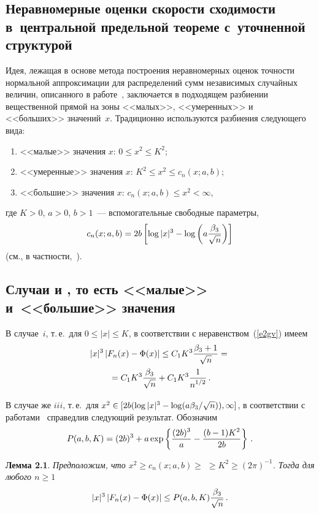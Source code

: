 \begin{multicols}{2}
\section{Неравномерные оценки скорости сходимости в~центральной предельной теореме с~уточненной структурой}

Идея, лежащая в основе метода построения неравномерных оценок
точности нормальной аппроксимации для распределений сумм независимых
случайных величин, описанного в работе~\cite{Paditz89}, заключается
в подходящем разбиении вещественной прямой на зоны <<малых>>,
<<умеренных>> и <<больших>> значений~$x$. Традиционно используются
разбиения следующего вида:
\begin{enumerate}[$i$]
\item
<<малые>> значения $x$: $0\le x^2\le K^2$;
\item
<<умеренные>> значения $x$: $K^2\le x^2\le c_n(x;a,b)$;
\item
<<большие>> значения $x$: $c_n(x;a,b)\le x^2<\infty$,
\end{enumerate}
где $K>0$, $a>0$, $b>1$~--- вспомогательные свободные
параметры,
$$
c_n(x;a,b)=2b\left[\log|x|^{3}-\log\left(a\displaystyle\frac{\displaystyle \beta_{3}\mathstrut}{\displaystyle \sqrt{n}\mathstrut}\right)\right]
$$
(см., в частности,~\cite{Paditz89, Rychlik}).

\subsection{Случаи  и , то есть <<малые>> и~<<большие>> значения }

В случае~$i$, т.\,е.\ для $0\le |x|\le K$, в соответствии с
неравенством~(\ref{e2gv}) имеем
\begin{multline}
|x|^{3}\left|F_n(x)-\Phi(x)\right|\le
C_1K^{3}\displaystyle\frac{\displaystyle \beta_{3}+1\mathstrut}{\displaystyle \sqrt{n}\mathstrut}={}\\
{}=C_1K^{3}\displaystyle\frac{\displaystyle \beta_{3}\mathstrut}{\displaystyle \sqrt{n}\mathstrut}+C_1K^{3}\displaystyle\frac{\displaystyle 1\mathstrut}{\displaystyle n^{1/2}\mathstrut}\,. 
\label{e6gv}
\end{multline}


В случае же $iii$, т.\,е.\ для
$x^2\in[2b(\log|x|^{\dd}\hm-\log(a\beta_3/\sqrt{n})),\infty]$, в
соответствии с работами~\cite{Paditz81, Tysiak} справедлив следующий результат.
Обозначим
$$
P(a,b,K)=(2b)^{3}+a\exp\left\{\displaystyle\frac{\displaystyle (2b)^{3}\mathstrut}{\displaystyle a\mathstrut}-\displaystyle\frac{\displaystyle (b-1)K^2\mathstrut}{\displaystyle 2b\mathstrut}\right\}\,.
$$

\smallskip

\noindent
\textbf{Лемма 2.1}. \textit{Предположим, что $x^2\ge c_n(x;a,b)\ge$\linebreak
$\ge K^2\ge (2\pi)^{-1}$. Тогда для любого $n\ge1$}
\begin{equation*}
|x|^{3}\left|F_n(x)-\Phi(x)\right|\le P(a,b,K)\displaystyle\frac{\displaystyle \beta_{3}\mathstrut}{\displaystyle \sqrt{n}\mathstrut}\,.
\end{equation*}


\end{multicols}
